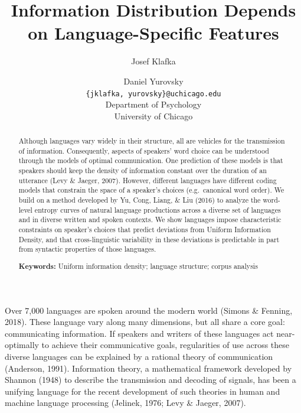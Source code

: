 \documentclass[10pt, letterpaper]{article}
\title{Information Distribution Depends on Language-Specific Features}
\author{Josef Klafka \and Daniel Yurovsky \\
        \texttt{\{jklafka, yurovsky\}@uchicago.edu} \\
       Department of Psychology \\ University of Chicago}
\begin{document}
\maketitle

\begin{abstract}
Although languages vary widely in their structure, all are vehicles for
the transmission of information. Consequently, aspects of speakers' word
choice can be understood through the models of optimal communication.
One prediction of these models is that speakers should keep the density
of information constant over the duration of an utterance (Levy \&
Jaeger, 2007). However, different languages have different coding models
that constrain the space of a speaker's choices (e.g.~canonical word
order). We build on a method developed by Yu, Cong, Liang, \& Liu (2016)
to analyze the word-level entropy curves of natural language productions
across a diverse set of languages and in diverse written and spoken
contexts. We show languages impose characteristic constraints on
speaker's choices that predict deviations from Uniform Information
Density, and that cross-linguistic variability in these deviations is
predictable in part from syntactic properties of those languages.

\textbf{Keywords:}
Uniform information density; language structure; corpus analysis
\end{abstract}

Over 7,000 languages are spoken around the modern world (Simons \&
Fenning, 2018). These language vary along many dimensions, but all share
a core goal: communicating information. If speakers and writers of these
languages act near-optimally to achieve their communicative goals,
regularities of use across these diverse languages can be explained by a
rational theory of communication (Anderson, 1991). Information theory, a
mathematical framework developed by Shannon (1948) to describe the
transmission and decoding of signals, has been a unifying language for
the recent development of such theories in human and machine language
processing (Jelinek, 1976; Levy \& Jaeger, 2007).
\end{document}
